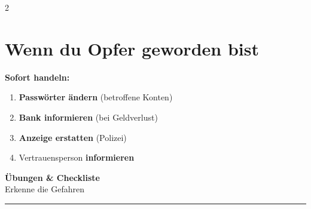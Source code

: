 \documentclass[a4paper,landscape,8pt]{extarticle}
\begin{document}
\begin{multicols}{2}
\vspace{3mm}

\section*{Wenn du Opfer geworden bist}

\textbf{Sofort handeln:}
\begin{enumerate}
\item \textbf{Passwörter ändern} (betroffene Konten)
\item \textbf{Bank informieren} (bei Geldverlust)
\item \textbf{Anzeige erstatten} (Polizei)
\item Vertrauensperson \textbf{informieren}
\end{enumerate}

\vspace{2mm}

\begin{center}
\end{center}

\end{multicols}

\newpage


\begin{center}
{\LARGE\bfseries Übungen \& Checkliste}\\[3pt]
{\normalsize Erkenne die Gefahren}
\end{center}

\vspace{1mm}
\hrule
\vspace{2mm}
\end{document}
